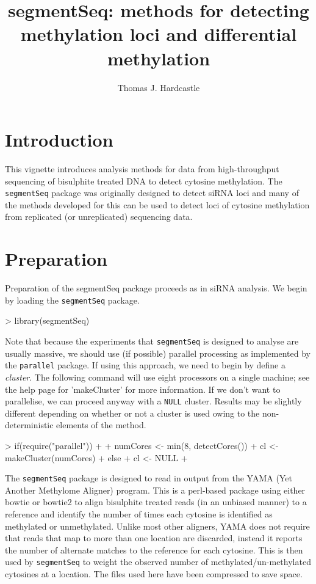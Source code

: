 \documentclass[a4paper]{article}
\title{segmentSeq: methods for detecting methylation loci and differential methylation}
\author{Thomas J. Hardcastle}
\begin{document}
\maketitle

\section{Introduction}

This vignette introduces analysis methods for data from high-throughput sequencing of bisulphite treated DNA to detect cytosine methylation. The \verb'segmentSeq' package was originally designed to detect siRNA loci \cite{Hardcastle:2011} and many of the methods developed for this can be used to detect loci of cytosine methylation from replicated (or unreplicated) sequencing data.

\section{Preparation}

Preparation of the segmentSeq package proceeds as in siRNA analysis. We begin by loading the \verb'segmentSeq' package.

\begin{Schunk}
\begin{Sinput}
>   library(segmentSeq)
\end{Sinput}
\end{Schunk}

Note that because the experiments that \verb'segmentSeq' is designed to analyse are usually massive, we should use (if possible) parallel processing as implemented by the \verb'parallel' package. If using this approach, we need to begin by define a \textsl{cluster}. The following command will use eight processors on a single machine; see the help page for 'makeCluster' for more information. If we don't want to parallelise, we can proceed anyway with a \verb'NULL' cluster. Results may be slightly different depending on whether or not a cluster is used owing to the non-deterministic elements of the method.

\begin{Schunk}
\begin{Sinput}
> if(require("parallel")) 
+ {
+     numCores <- min(8, detectCores())
+     cl <- makeCluster(numCores)
+ } else {
+     cl <- NULL
+ }
\end{Sinput}
\end{Schunk}

The \verb'segmentSeq' package is designed to read in output from the YAMA (Yet Another Methylome Aligner) program. This is a perl-based package using either bowtie or bowtie2 to align bisulphite treated reads (in an unbiased manner) to a reference and identify the number of times each cytosine is identified as methylated or unmethylated. Unlike most other aligners, YAMA does not require that reads that map to more than one location are discarded, instead it reports the number of alternate matches to the reference for each cytosine. This is then used by \verb'segmentSeq' to weight the observed number of methylated/un-methylated cytosines at a location. The files used here have been compressed to save space.
\end{document}
